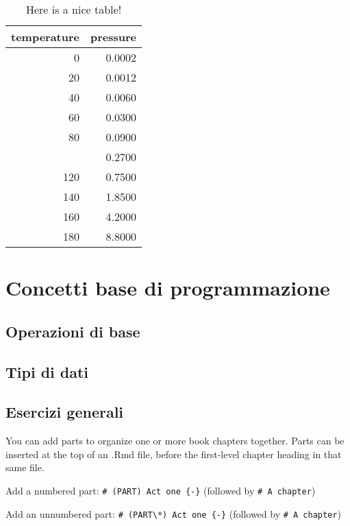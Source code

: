 \documentclass[
]{book}
\theoremstyle{definition}
\theoremstyle{definition}
\theoremstyle{definition}
\theoremstyle{definition}
\theoremstyle{remark}
\begin{document}
\begin{table}

\caption{\label{tab:nice-tab}Here is a nice table!}
\centering
\begin{tabular}[t]{rr}
\toprule
temperature & pressure\\
\midrule
0 & 0.0002\\
20 & 0.0012\\
40 & 0.0060\\
60 & 0.0300\\
80 & 0.0900\\
\addlinespace
100 & 0.2700\\
120 & 0.7500\\
140 & 1.8500\\
160 & 4.2000\\
180 & 8.8000\\
\bottomrule
\end{tabular}
\end{table}

\hypertarget{concetti-base-di-programmazione}{%
\chapter{Concetti base di programmazione}\label{concetti-base-di-programmazione}}

\hypertarget{operazioni-di-base}{%
\section{Operazioni di base}\label{operazioni-di-base}}

\hypertarget{tipi-di-dati}{%
\section{Tipi di dati}\label{tipi-di-dati}}

\hypertarget{esercizi-generali}{%
\section{Esercizi generali}\label{esercizi-generali}}

You can add parts to organize one or more book chapters together. Parts can be inserted at the top of an .Rmd file, before the first-level chapter heading in that same file.

Add a numbered part: \texttt{\#\ (PART)\ Act\ one\ \{-\}} (followed by \texttt{\#\ A\ chapter})

Add an unnumbered part: \texttt{\#\ (PART\textbackslash{}*)\ Act\ one\ \{-\}} (followed by \texttt{\#\ A\ chapter})
\end{document}
